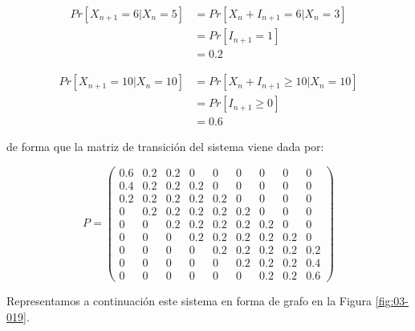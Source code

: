\documentclass[
]{book}
\theoremstyle{definition}
\theoremstyle{definition}
\theoremstyle{definition}
\theoremstyle{definition}
\theoremstyle{remark}
\begin{document}
\[\begin{array}{ll}
Pr[X_{n+1} = 6 | X_n = 5] & = Pr[X_n + I_{n+1} = 6 | X_n = 3]\\
& = Pr[I_{n+1} = 1]\\
& = 0.2
\end{array}\]

\[\begin{array}{ll}
Pr[X_{n+1} = 10 | X_n = 10] & = Pr[X_n + I_{n+1} \geq 10 | X_n = 10]\\
& = Pr[I_{n+1} \geq 0]\\
& = 0.6
\end{array}\]

de forma que la matriz de transición del sistema viene dada por:

\[P = 
\begin{pmatrix}
0.6 & 0.2 & 0.2 & 0 & 0 & 0 & 0 & 0 & 0\\
0.4 & 0.2 & 0.2 & 0.2 & 0 & 0 & 0 & 0 & 0\\
0.2 & 0.2 & 0.2 & 0.2 & 0.2 & 0 & 0 & 0 & 0\\
0 & 0.2 & 0.2 & 0.2 & 0.2 & 0.2 & 0 & 0 & 0\\
0 & 0 & 0.2 & 0.2 & 0.2 & 0.2 & 0.2 & 0 & 0\\
0 & 0 & 0 & 0.2 & 0.2 & 0.2 & 0.2 & 0.2 & 0\\
0 & 0 & 0 & 0 & 0.2 & 0.2 & 0.2 & 0.2 & 0.2\\
0 & 0 & 0 & 0 & 0 & 0.2 & 0.2 & 0.2 & 0.4\\
0 & 0 & 0 & 0 & 0 & 0 & 0.2 & 0.2 & 0.6
\end{pmatrix}\]

Representamos a continuación este sistema en forma de grafo en la Figura \ref{fig:03-019}.
\end{document}
